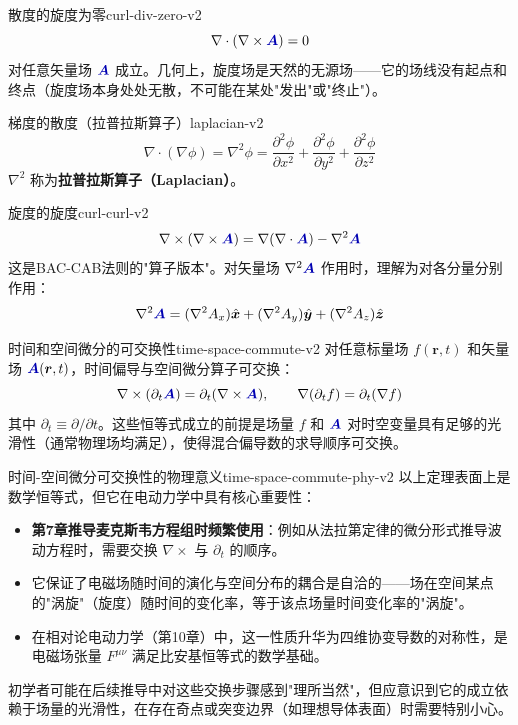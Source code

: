\documentclass[11pt,a4paper,openany,oneside]{book}
\newcommand{\vecA}{\textcolor{blue!70!black}{\vect{A}}}
\newcommand{\vect}[1]{\bm{#1}}
\newcommand{\unitvec}[1]{\hat{\vect{#1}}}
\newcommand{\grad}{\nabla}
\newcommand{\curl}{\nabla\times}
\newcommand{\divg}{\nabla\cdot}
\newcommand{\lap}{\nabla^2}
\begin{document}
\begin{theorem}{散度的旋度为零}{curl-div-zero-v2}
\[
\divg(\curl\vecA) = 0
\]
对任意矢量场 $\vecA$ 成立。几何上，旋度场是天然的无源场——它的场线没有起点和终点（旋度场本身处处无散，不可能在某处"发出"或"终止"）。
\end{theorem}

\begin{theorem}{梯度的散度（拉普拉斯算子）}{laplacian-v2}
\[
\divg(\grad\phi) = \lap\phi = \frac{\partial^2\phi}{\partial x^2} + \frac{\partial^2\phi}{\partial y^2} + \frac{\partial^2\phi}{\partial z^2}
\]
$\lap$ 称为\textbf{拉普拉斯算子（Laplacian）}。
\end{theorem}

\begin{theorem}{旋度的旋度}{curl-curl-v2}
\[
\curl(\curl\vecA) = \grad(\divg\vecA) - \lap\vecA
\]
这是BAC-CAB法则的"算子版本"。对矢量场 $\lap\vecA$ 作用时，理解为对各分量分别作用：
\[
\lap\vecA = (\lap A_x)\unitvec{x} + (\lap A_y)\unitvec{y} + (\lap A_z)\unitvec{z}
\]
\end{theorem}

\begin{theorem}{时间和空间微分的可交换性}{time-space-commute-v2}
对任意标量场 $f(\vect{r},t)$ 和矢量场 $\vecA(\vect{r},t)$，时间偏导与空间微分算子可交换：
\[
\nabla\times(\partial_t \vecA) = \partial_t(\nabla\times\vecA), \qquad
\nabla(\partial_t f) = \partial_t(\nabla f)
\]
其中 $\partial_t \equiv \partial/\partial t$。这些恒等式成立的前提是场量 $f$ 和 $\vecA$ 对时空变量具有足够的光滑性（通常物理场均满足），使得混合偏导数的求导顺序可交换。
\end{theorem}

\begin{insight}{时间-空间微分可交换性的物理意义}{time-space-commute-phy-v2}
以上定理表面上是数学恒等式，但它在电动力学中具有核心重要性：
\begin{itemize}
\item \textbf{第7章推导麦克斯韦方程组时频繁使用}：例如从法拉第定律的微分形式推导波动方程时，需要交换 $\nabla\times$ 与 $\partial_t$ 的顺序。
\item 它保证了电磁场随时间的演化与空间分布的耦合是自洽的——场在空间某点的"涡旋"（旋度）随时间的变化率，等于该点场量时间变化率的"涡旋"。
\item 在相对论电动力学（第10章）中，这一性质升华为四维协变导数的对称性，是电磁场张量 $F^{\mu\nu}$ 满足比安基恒等式的数学基础。
\end{itemize}
初学者可能在后续推导中对这些交换步骤感到"理所当然"，但应意识到它的成立依赖于场量的光滑性，在存在奇点或突变边界（如理想导体表面）时需要特别小心。
\end{insight}
\end{document}
